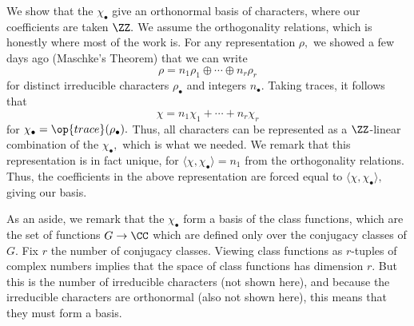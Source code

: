 We show that the $\chi_\bullet$ give an orthonormal basis of characters, where our coefficients are taken $\ZZ.$ We assume the orthogonality relations, which is honestly where most of the work is. For any representation $\rho,$ we showed a few days ago (Maschke’s Theorem) that we can write
\[\rho=n_1\rho_1\oplus\cdots\oplus n_r\rho_r\]
for distinct irreducible characters $\rho_\bullet$ and integers $n_\bullet.$ Taking traces, it follows that
\[\chi=n_1\chi_1+\cdots+n_r\chi_r\]
for $\chi_\bullet=\op{trace}(\rho_\bullet).$ Thus, all characters can be represented as a $\ZZ$-linear combination of the $\chi_\bullet,$ which is what we needed. We remark that this representation is in fact unique, for $\langle\chi,\chi_\bullet\rangle=n_1$ from the orthogonality relations. Thus, the coefficients in the above representation are forced equal to $\langle\chi,\chi_\bullet\rangle,$ giving our basis.

As an aside, we remark that the $\chi_\bullet$ form a basis of the class functions, which are the set of functions $G\to\CC$ which are defined only over the conjugacy classes of $G.$ Fix $r$ the number of conjugacy classes. Viewing class functions as $r$-tuples of complex numbers implies that the space of class functions has dimension $r.$ But this is the number of irreducible characters (not shown here), and because the irreducible characters are orthonormal (also not shown here), this means that they must form a basis.